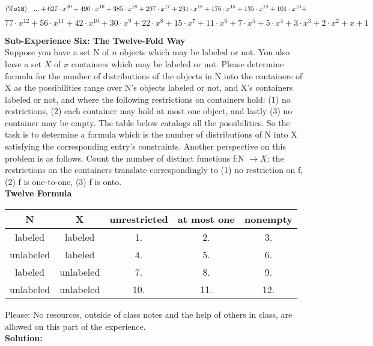 \documentclass[10pt,a4paper]{report}
\begin{document}
\normalsize\[\mathrm{\tt (\%o18) }\quad ...+627\cdot {{x}^{20}}+490\cdot {{x}^{19}}+385\cdot {{x}^{18}}+297\cdot {{x}^{17}}+231\cdot {{x}^{16}}+176\cdot {{x}^{15}}+135\cdot {{x}^{14}}+101\cdot {{x}^{13}}+\]\[77\cdot {{x}^{12}}+56\cdot {{x}^{11}}+42\cdot {{x}^{10}}+30\cdot {{x}^{9}}+22\cdot {{x}^{8}}+15\cdot {{x}^{7}}+11\cdot {{x}^{6}}+7\cdot {{x}^{5}}+5\cdot {{x}^{4}}+3\cdot {{x}^{3}}+2\cdot {{x}^{2}}+x+1\]


	\textbf{Sub-Experience Six: The Twelve-Fold Way}\\
	Suppose you have a set N of $n$ objects which may be labeled or not.  You also have a set $X$ of $x$ containers which may be labeled or not.  Please determine formula for the number of distributions of the objects in N into the containers of X as the possibilities range over N's objects labeled or not, and X's containers labeled or not, and where the following restrictions on containers hold:  (1) no restrictions,  (2) each container may hold at most one object, and lastly (3) no container may be empty.  The table below catalogs all the possibilities.  So the task is to determine a formula which is the number of distributions of N into X satisfying the corresponding entry's constraints.  Another perspective on this problem is as follows.  Count the number of distinct functions f:N $\rightarrow X$; the restrictions on the containers translate correspondingly to (1) no restriction on f, (2) f is one-to-one, (3) f is onto.\\
	\newline
	\textbf{Twelve Formula}\\
	\begin{center}
		\begin{tabular}{c|c||c|c|c}
			\hline
			N&X&unrestricted&at most one&nonempty\\
			\hline
			labeled&labeled&1.&2.&3.\\
			unlabeled&labeled&4.&5.&6.\\
			labeled&unlabeled&7.&8.&9.\\
			unlabeled&unlabeled&10.&11.&12.\\
			\hline
			\end{tabular}
	\end{center}
	Please: No resources, outside of class notes and the help of others in class, are allowed on this part of the experience.\\
	\newline
	\textbf{Solution: }\\
	\newline
\end{document}
